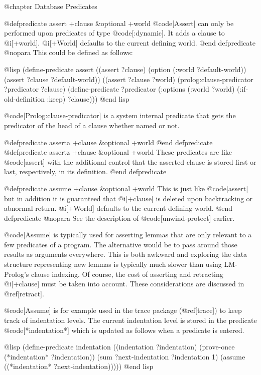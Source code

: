 {@chapter Database Predicates

@defpredicate assert +clause &optional +world
@code[Assert] can only be performed upon predicates of type @code[:dynamic].
It adds a clause to @i[+world].  
@i[+World] defaults to the current defining world.
@end defpredicate
@nopara
This could be defined as follows:

@lisp
(define-predicate assert
  ((assert ?clause)
   (option (:world ?default-world))
   (assert ?clause ?default-world))
  ((assert ?clause ?world)
   (prolog:clause-predicator ?predicator ?clause)
   (define-predicate ?predicator
     (:options (:world ?world)
               (:if-old-definition :keep)
     ?clause)))
@end lisp

@code[Prolog:clause-predicator] is a system internal
predicate that gets the predicator of the head of a clause whether named or
not.

@defpredicate asserta +clause &optional +world
@end defpredicate
@defpredicate assertz +clause &optional +world
These predicates are like @code[assert] with the additional control that
the asserted clause is stored first or last, respectively, in its
definition.
@end defpredicate

@defpredicate assume +clause &optional +world
This is just like @code[assert] but in addition it is guaranteed that 
@i[+clause] is deleted upon backtracking or abnormal return.
@i[+World] defaults to the current defining world.
@end defpredicate
@nopara
See the description of @code[unwind-protect] earlier.

@code[Assume] is typically used for asserting lemmas that are only relevant
to a few predicates of a program.
The alternative would be to pass around those
results as arguments everywhere. 
This is both awkward and exploring the data structure representing new lemmas
is typically much slower than using LM-Prolog's clause indexing.
Of course, the cost of asserting and retracting @i[+clause] must
be taken into account.
These considerations are discussed in @ref[retract].

@code[Assume] is for example used in the trace package (@ref[trace]) to keep
track of indentation levels. The current indentation level is stored in the
predicate @code[*indentation*] which is updated as follows when a predicate
is entered.

@lisp
(define-predicate indentation
  ((indentation ?indentation)
   (prove-once (*indentation* ?indentation))
   (sum ?next-indentation ?indentation 1)
   (assume ((*indentation* ?next-indentation)))))
@end lisp

}
